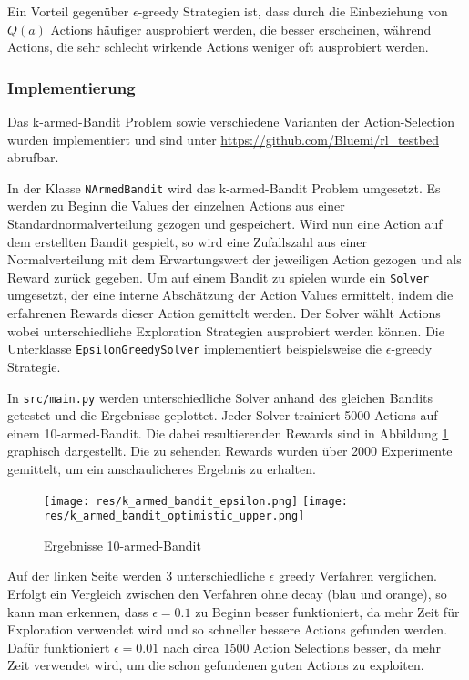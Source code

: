 \documentclass[11pt]{scrartcl}
\begin{document}
Ein Vorteil gegenüber $\epsilon$-greedy Strategien ist, dass durch die Einbeziehung von
$Q(a)$ Actions häufiger ausprobiert werden, die besser erscheinen, während Actions, die
sehr schlecht wirkende Actions weniger oft ausprobiert werden.


\subsubsection{Implementierung}
Das k-armed-Bandit Problem sowie verschiedene Varianten der Action-Selection wurden
implementiert und sind unter \url{https://github.com/Bluemi/rl_testbed} abrufbar.

In der Klasse \lstinline!NArmedBandit! wird das k-armed-Bandit Problem umgesetzt. Es
werden zu Beginn die Values der einzelnen Actions aus einer Standardnormalverteilung
gezogen und gespeichert. Wird nun eine Action auf dem erstellten Bandit gespielt, so wird
eine Zufallszahl aus einer Normalverteilung mit dem Erwartungswert der jeweiligen Action
gezogen und als Reward zurück gegeben.
Um auf einem Bandit zu spielen wurde ein \lstinline!Solver! umgesetzt, der eine interne
Abschät\-zung der Action Values ermittelt, indem die erfahrenen Rewards dieser Action
gemittelt werden. Der Solver wählt Actions wobei unterschiedliche Exploration Strategien
ausprobiert werden können. Die Unterklasse \lstinline!EpsilonGreedySolver! implementiert
beispielsweise die $\epsilon$-greedy Strategie.

In \lstinline!src/main.py! werden unterschiedliche Solver anhand des gleichen Bandits
getestet und die Ergebnisse geplottet. Jeder Solver trainiert 5000 Actions auf einem
10-armed-Bandit. Die dabei resultierenden Rewards sind in Abbildung
\ref{fig:karmed_bandit} graphisch dargestellt. Die zu sehenden Rewards wurden über 2000
Experimente gemittelt, um ein anschaulicheres Ergebnis zu erhalten.

\begin{figure}[htp]
\centering
\texttt{[image: res/k\_armed\_bandit\_epsilon.png]}
\texttt{[image: res/k\_armed\_bandit\_optimistic\_upper.png]}
\caption{Ergebnisse 10-armed-Bandit}
\label{fig:karmed_bandit}
\end{figure}

\noindent
Auf der linken Seite werden 3 unterschiedliche $\epsilon$ greedy Verfahren verglichen.
Erfolgt ein Vergleich zwischen den Verfahren ohne decay (blau und orange), so kann man
erkennen, dass $\epsilon = 0.1$ zu Beginn besser funktioniert, da mehr Zeit für
Exploration verwendet wird und so schneller bessere Actions gefunden werden. Dafür
funktioniert $\epsilon = 0.01$ nach circa 1500 Action Selections besser, da mehr Zeit
verwendet wird, um die schon gefundenen guten Actions zu exploiten.
\end{document}
